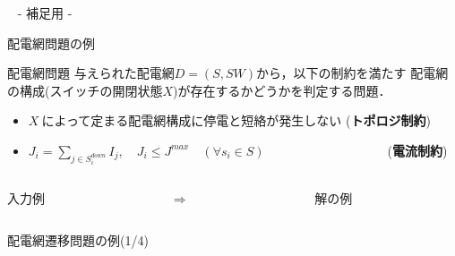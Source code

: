 \appendix
\backupbegin

\begin{frame}{~}
 \centering
 - 補足用 -
\end{frame} 
\begin{frame}{配電網問題の例}
 
 \begin{block}{配電網問題}
  与えられた配電網$D=(S,SW)$から，以下の制約を満たす
  配電網の構成(スイッチの開閉状態$X$)が存在するかどうかを判定する問題．
 \begin{itemize}\small
  \item $X ~\textrm{によって定まる配電網構成に停電と短絡が発生しない}$ (\textbf{トポロジ制約})
  \item $J_i = \displaystyle\sum_{j\in S_i^{down}} I_j, \quad J_i \leq J^{max} 
        \quad (\forall s_{i}\in S)\qquad\qquad\qquad\qquad\quad~~$ (\textbf{電流制約})
 \end{itemize}
 \end{block}
  \begin{columns}
    \begin{column}{0.45\textwidth}\centering
      \begin{exampleblock}{入力例}
	\centering
	\scalebox{0.3}{}
      \end{exampleblock}
    \end{column}
    \begin{column}{0.05\textwidth}\centering
      $\Rightarrow$
    \end{column}
    \begin{column}{0.45\textwidth}\centering
      \begin{exampleblock}{解の例}
        \centering
        \scalebox{0.3}{}
      \end{exampleblock}
    \end{column}
  \end{columns}
\end{frame}
\begin{frame}{配電網遷移問題の例(1/4)}
 \vfill
 \begin{figure}[t]
  \centering
  \scalebox{0.65}{}
  \vspace{-0.1cm}
  \caption*{}
 \end{figure}
\end{frame}
